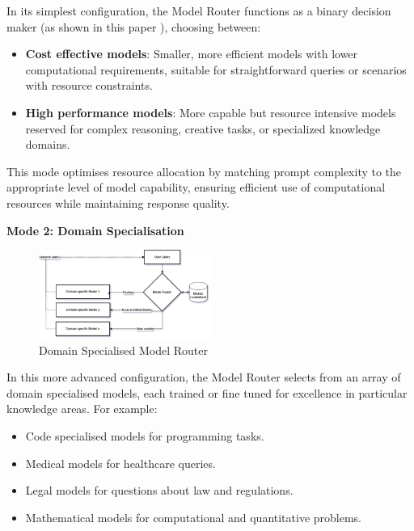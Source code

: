 In its simplest configuration, the Model Router functions as a binary decision maker (as shown in this paper \cite{ong2025routellmlearningroutellms}), choosing between:

\begin{itemize}
    \item \textbf{Cost effective models}: Smaller, more efficient models with lower computational requirements, suitable for straightforward queries or scenarios with resource constraints.
    \item \textbf{High performance models}: More capable but resource intensive models reserved for complex reasoning, creative tasks, or specialized knowledge domains.
\end{itemize}

This mode optimises resource allocation by matching prompt complexity to the appropriate level of model capability, ensuring efficient use of computational resources while maintaining response quality.

\textbf{Mode 2: Domain Specialisation}  

\begin{figure}[H]
    \centering
    \includegraphics[width=0.5\textwidth]{figures/model-router.drawio.png}
    \caption{Domain Specialised Model Router}
    \label{fig:domain_specialised_model_router}
\end{figure}

In this more advanced configuration, the Model Router selects from an array of domain specialised models, each trained or fine tuned for excellence in particular knowledge areas. For example:

\begin{itemize}
    \item Code specialised models for programming tasks.
    \item Medical models for healthcare queries.
    \item Legal models for questions about law and regulations.
    \item Mathematical models for computational and quantitative problems.
\end{itemize}

